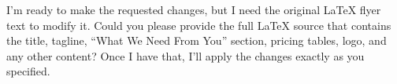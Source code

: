 I’m ready to make the requested changes, but I need the original LaTeX flyer text to modify it. Could you please provide the full LaTeX source that contains the title, tagline, “What We Need From You” section, pricing tables, logo, and any other content? Once I have that, I’ll apply the changes exactly as you specified.